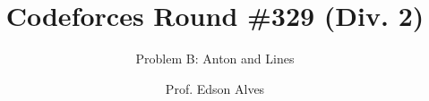 \title{Codeforces Round \#329 (Div. 2)}
\subtitle{Problem B: Anton and Lines}
\date{}
\author{Prof. Edson Alves}
